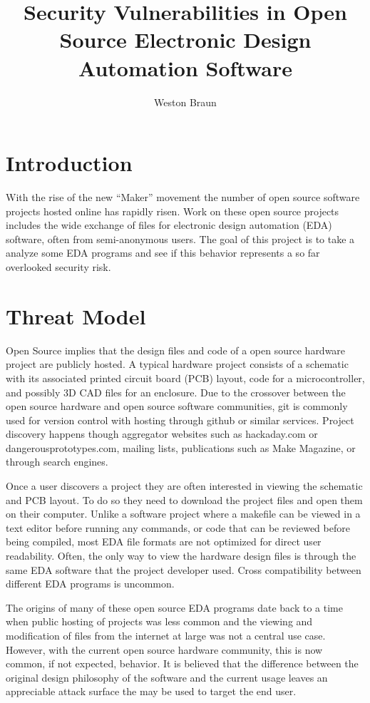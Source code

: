 \documentclass[12pt]{article}
\begin{document}
\title{Security Vulnerabilities in Open Source Electronic Design Automation Software}
\author{Weston Braun}
\maketitle

\section{Introduction}
\label{S:1}
With the rise of the new ``Maker'' movement the number of open source software projects hosted online has rapidly risen. Work on these open source projects includes the wide exchange of files for electronic design automation (EDA) software, often from semi-anonymous users. The goal of this project is to take a analyze some EDA programs and see if this behavior represents a so far overlooked security risk. 

\section{Threat Model}
\label{S:2}
Open Source implies that the design files and code of a open source hardware project are publicly hosted. A typical hardware project consists of a schematic with its associated printed circuit board (PCB) layout, code for a microcontroller, and possibly 3D CAD files for an enclosure. Due to the crossover between the open source hardware and open source software communities, git is commonly used for version control with hosting through github or similar services. Project discovery happens though aggregator websites such as hackaday.com or dangerousprototypes.com, mailing lists, publications such as Make Magazine, or through search engines. 

Once a user discovers a project they are often interested in viewing the schematic and PCB layout. To do so they need to download the project files and open them on their computer. Unlike a software project where a makefile can be viewed in a text editor before running any commands, or code that can be reviewed before being compiled, most EDA file formats are not optimized for direct user readability. Often, the only way to view the hardware design files is through the same EDA software that the project developer used. Cross compatibility between different EDA programs is uncommon. 

The origins of many of these open source EDA programs date back to a time when public hosting of projects was less common and the viewing and modification of files from the internet at large was not a central use case. However, with the current open source hardware community, this is now common, if not expected, behavior. It is believed that the difference between the original design philosophy of the software and the current usage leaves an appreciable attack surface the may be used to target the end user.  
\end{document}
